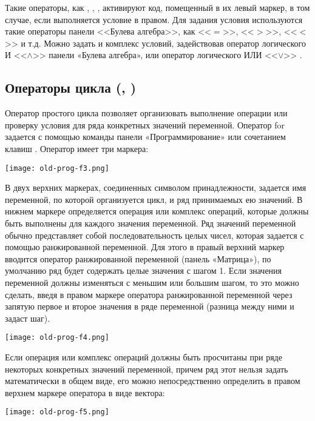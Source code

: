 Такие операторы, как , , , активируют код, помещенный в их левый маркер, в том случае, если выполняется условие в правом. Для задания условия используются такие операторы панели <<Булева алгебра>>, как <<$=$>>, <<$>$>>, <<$<$>> и т.д. Можно задать и комплекс условий, задействовав оператор логического И <<$\land$>> панели «Булева алгебра», или оператор логического ИЛИ <<$\lor$>> .

\subsection*{Операторы цикла (, )}

Оператор простого цикла  позволяет организовать выполнение операции или проверку условия для ряда конкретных значений переменной. Оператор for задается с помощью команды панели «Программирование» или сочетанием клавиш . Оператор  имеет три маркера:
\begin{center}
	\texttt{[image: old-prog-f3.png]}
\end{center}


В двух верхних маркерах, соединенных символом принадлежности, задается имя переменной, по которой организуется цикл, и ряд принимаемых ею значений. В нижнем маркере определяется операция или комплекс операций, которые должны быть выполнены для каждого значения переменной. Ряд значений переменной обычно представляет собой последовательность целых чисел, которая задается с помощью ранжированной переменной. Для этого в правый верхний маркер вводится оператор ранжированной переменной (панель «Матрица»), по умолчанию ряд будет содержать целые значения с шагом 1. Если значения переменной должны изменяться с меньшим или большим шагом, то это можно сделать, введя в правом маркере оператора ранжированной переменной через запятую первое и второе значения в ряде переменной (разница между ними и задаст шаг).
\begin{center}
	\texttt{[image: old-prog-f4.png]}
\end{center}


Если операция или комплекс операций должны быть просчитаны при ряде некоторых конкретных значений переменной, причем ряд этот нельзя задать математически в общем виде, его можно непосредственно определить в правом верхнем маркере оператора  в виде вектора:
\begin{center}
	\texttt{[image: old-prog-f5.png]}
\end{center}

